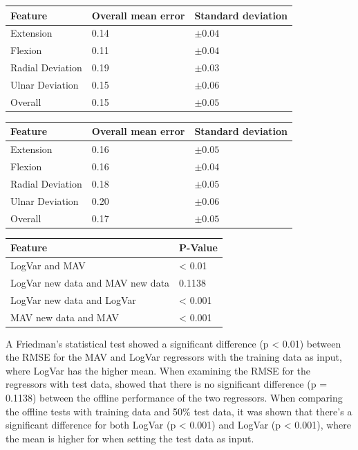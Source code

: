	\begin{center}
		\begin{tabular}{l l l}
			\toprule
			\textbf{Feature} & \textbf{Overall mean error} & \textbf{Standard deviation}\\
			\midrule
			Extension & 0.14 & $\pm 0.04$ \\
			Flexion & 0.11 & $\pm 0.04$ \\
			Radial Deviation & 0.19 & $\pm 0.03$ \\
			Ulnar Deviation & 0.15 & $\pm 0.06$ \\
			Overall & 0.15 & $\pm 0.05$ \\
			\bottomrule
		\end{tabular}
	\end{center}
	

	
	\begin{center}
		\begin{tabular}{l l l}
			\toprule
			\textbf{Feature} & \textbf{Overall mean error} & \textbf{Standard deviation}\\
			\midrule
			Extension & 0.16 & $\pm 0.05$ \\
			Flexion & 0.16 & $\pm 0.04$ \\
			Radial Deviation & 0.18 & $\pm 0.05$ \\
			Ulnar Deviation & 0.20 & $\pm 0.06$ \\
			Overall & 0.17 & $\pm 0.05$ \\
			\bottomrule
		\end{tabular}
	\end{center}
	
		\begin{center}
			\begin{tabular}{l l}
				\toprule
				\textbf{Feature} & \textbf{P-Value}\\
				\midrule
				LogVar and MAV & < 0.01 \\
				LogVar new data and MAV new data & 0.1138 \\
				LogVar new data and LogVar & < 0.001 \\
				MAV new data and MAV & < 0.001 \\
				\bottomrule
			\end{tabular}
		\end{center}
		
A Friedman's statistical test showed a significant difference (p < 0.01) between the RMSE for the MAV and LogVar regressors with the training data as input, where LogVar has the higher mean. When examining the RMSE for the regressors with test data, showed that there is no significant difference (p = 0.1138) between the offline performance of the two regressors. When comparing the offline tests with training data and 50\% test data, it was shown that there's a significant difference for both LogVar (p < 0.001) and LogVar (p < 0.001), where the mean is higher for when setting the test data as input.
